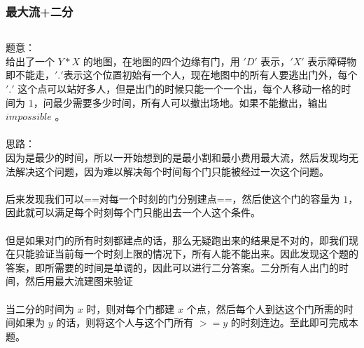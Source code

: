 \documentclass[twoside]{article}
\begin{document}
\subsubsection{最大流+二分}
\begin{lstlisting}
\end{lstlisting}
题意：\\
给出了一个 $Y*X$ 的地图，在地图的四个边缘有门，用 $'D'$ 表示，$'X'$ 表示障碍物即不能走，$'.'$表示这个位置初始有一个人，现在地图中的所有人要逃出门外，每个 $'.'$ 这个点可以站好多人，但是出门的时候只能一个一个出，每个人移动一格的时间为 $1$，问最少需要多少时间，所有人可以撤出场地。如果不能撤出，输出 $impossible$ 。\\
\\
思路：\\
因为是最少的时间，所以一开始想到的是最小割和最小费用最大流，然后发现均无法解决这个问题，因为难以解决每个时间每个门只能被经过一次这个问题。\\
\\
后来发现我们可以==对每一个时刻的门分别建点==，然后使这个门的容量为 $1$，因此就可以满足每个时刻每个门只能出去一个人这个条件。\\
\\
但是如果对门的所有时刻都建点的话，那么无疑跑出来的结果是不对的，即我们现在只能验证当前每一个时刻上限的情况下，所有人能不能出来。因此发现这个题的答案，即所需要的时间是单调的，因此可以进行二分答案。二分所有人出门的时间，然后用最大流建图来验证\\
\\
当二分的时间为 $x$ 时，则对每个门都建 $x$ 个点，然后每个人到达这个门所需的时间如果为 $y$ 的话，则将这个人与这个门所有 $>=y$ 的时刻连边。至此即可完成本题。\\
\end{document}
